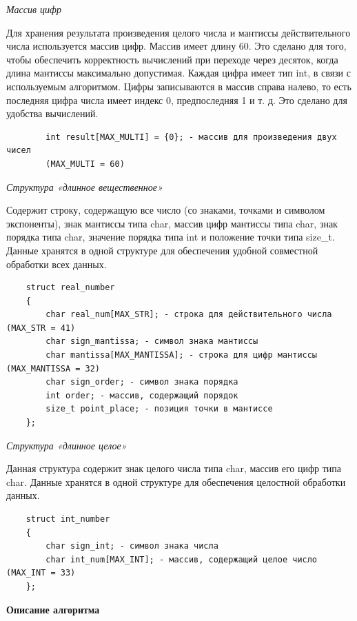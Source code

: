 \documentclass[a4paper, 12pt, -shell-escape]{article}  %
\begin{document}
	\textit{Массив цифр}
	
	Для хранения результата произведения целого числа и мантиссы действительного числа используется массив цифр. Массив имеет длину 60. Это сделано для того, чтобы обеспечить корректность вычислений при переходе через десяток, когда длина мантиссы максимально допустимая. Каждая цифра имеет тип int, в связи с используемым алгоритмом. Цифры записываются в массив справа налево, то есть последняя цифра числа имеет индекс 0, предпоследняя 1 и т. д. Это сделано для удобства вычислений.
	
	\begin{verbatim}
	    int result[MAX_MULTI] = {0}; - массив для произведения двух чисел
	    (MAX_MULTI = 60)
	\end{verbatim}

	\textit{Структура «длинное вещественное»}
	
	Содержит строку, содержащую все число (со знаками, точками и символом экспоненты), знак мантиссы типа char, массив цифр мантиссы типа char, знак порядка типа char, значение порядка типа int и положение точки типа size\_t. Данные хранятся в одной структуре для обеспечения удобной совместной обработки всех данных.
	\begin{verbatim}
	struct real_number
	{
	    char real_num[MAX_STR]; - строка для действительного числа (MAX_STR = 41)
	    char sign_mantissa; - символ знака мантиссы
	    char mantissa[MAX_MANTISSA]; - строка для цифр мантиссы (MAX_MANTISSA = 32)
	    char sign_order; - символ знака порядка
	    int order; - массив, содержащий порядок
	    size_t point_place; - позиция точки в мантиссе
	};
	\end{verbatim}

	\textit{Структура «длинное целое»}
	
	Данная структура содержит знак целого числа типа char, массив его цифр типа char. Данные хранятся в одной структуре для обеспечения целостной обработки данных.
	\begin{verbatim}
	struct int_number
	{
	    char sign_int; - символ знака числа
	    char int_num[MAX_INT]; - массив, содержащий целое число (MAX_INT = 33)
	};
		\end{verbatim}






	\newpage
	\begin{center}
		\begin{large}
			\textbf{Описание алгоритма}\\
		\end{large}	
	\end{center}
\end{document}
